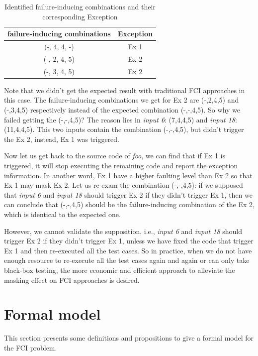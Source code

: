 \documentclass{sig-alternate}
\begin{document}
\begin{table}
\centering
\caption{Identified failure-inducing combinations and their corresponding Exception}
\label{identify-example}
\begin{tabular}{|c|c|} \hline
failure-inducing combinations & Exception\\ \hline
(-, 4, 4, -) &  Ex 1\\ \hline
(-, 2, 4, 5) &  Ex 2\\ \hline
(-, 3, 4, 5) &  Ex 2\\ \hline
\hline\end{tabular}
\end{table}

Note that we didn't get the expected result with traditional FCI approaches in this case. The failure-inducing combinations we get for Ex 2 are (-,2,4,5) and (-,3,4,5) respectively instead of the expected combination (-,-,4,5). So why we failed getting the (-,-,4,5)? The reason lies in \emph{input 6}: (7,4,4,5) and \emph{input 18}: (11,4,4,5). This two inputs contain the combination (-,-,4,5), but didn't trigger the Ex 2, instead,  Ex 1 was triggered.


Now let us get back to the source code of \emph{foo}, we can find that if Ex 1 is triggered, it will stop executing the remaining code and report the exception information. In another word, Ex 1 have a higher faulting level than Ex 2 so that Ex 1 may mask Ex 2. Let us re-exam the combination (-,-,4,5): if we supposed that \emph{input 6} and \emph{input 18} should trigger Ex 2 if they didn't trigger Ex 1, then we can conclude that (-,-,4,5) should be the failure-inducing combination of the Ex 2, which is identical to the expected one.

However, we cannot validate the supposition, i.e., \emph{input 6} and \emph{input 18} should trigger Ex 2 if they didn't trigger Ex 1, unless we have fixed the code that trigger Ex 1 and then re-executed all the test cases. So in practice, when we do not have enough resource to re-execute all the test cases again and again or can only take black-box testing, the more economic and efficient approach to alleviate the masking effect on FCI approaches is desired.

\section{Formal model}
This section presents some definitions and propositions to give a formal model for the FCI problem.
\end{document}
